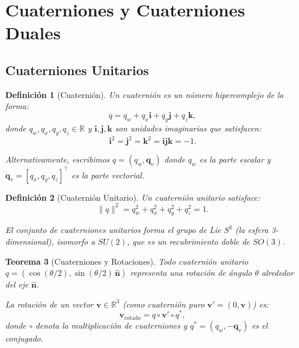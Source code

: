 \documentclass[11pt,a4paper]{article}
\newtheorem{theorem}{Teorema}[section]
\newtheorem{definition}[theorem]{Definición}
\begin{document}
\section{Cuaterniones y Cuaterniones Duales}
\label{sec:quaternions}

\subsection{Cuaterniones Unitarios}

\begin{definition}[Cuaternión]
Un \emph{cuaternión} es un número hipercomple­jo de la forma:
\begin{equation}
    q = q_w + q_x \mathbf{i} + q_y \mathbf{j} + q_z \mathbf{k},
\end{equation}
donde $q_w, q_x, q_y, q_z \in \mathbb{R}$ y $\mathbf{i}, \mathbf{j}, \mathbf{k}$ son unidades imaginarias que satisfacen:
\begin{equation}
    \mathbf{i}^2 = \mathbf{j}^2 = \mathbf{k}^2 = \mathbf{i}\mathbf{j}\mathbf{k} = -1.
\end{equation}

Alternativamente, escribimos $q = (q_w, \mathbf{q}_v)$ donde $q_w$ es la parte escalar y $\mathbf{q}_v = [q_x, q_y, q_z]^\top$ es la parte vectorial.
\end{definition}

\begin{definition}[Cuaternión Unitario]
Un \emph{cuaternión unitario} satisface:
\begin{equation}
    \|q\|^2 = q_w^2 + q_x^2 + q_y^2 + q_z^2 = 1.
\end{equation}

El conjunto de cuaterniones unitarios forma el grupo de Lie $S^3$ (la esfera 3-dimensional), isomorfo a $SU(2)$, que es un recubrimiento doble de $SO(3)$.
\end{definition}

\begin{theorem}[Cuaterniones y Rotaciones]
Todo cuaternión unitario $q = (\cos(\theta/2), \sin(\theta/2) \, \hat{\mathbf{n}})$ representa una rotación de ángulo $\theta$ alrededor del eje $\hat{\mathbf{n}}$.

La rotación de un vector $\mathbf{v} \in \mathbb{R}^3$ (como cuaternión puro $\mathbf{v}' = (0, \mathbf{v})$) es:
\begin{equation}
    \mathbf{v}_{\text{rotado}} = q \circ \mathbf{v}' \circ q^*,
\end{equation}
donde $\circ$ denota la multiplicación de cuaterniones y $q^* = (q_w, -\mathbf{q}_v)$ es el conjugado.
\end{theorem}
\end{document}
